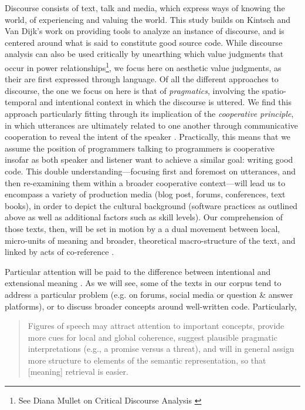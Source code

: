 Discourse consists of text, talk and media, which express ways of knowing the world, of experiencing and valuing the world. This study builds on Kintsch and Van Dijk's work on providing tools to analyze an instance of discourse, and is centered around what is said to constitute good source code. While discourse analysis can also be used critically by unearthing which value judgments that occur in power relationships\footnote{See Diana Mullet on Critical Discourse Analysis \citep{mullet_general_2018a}}, we focus here on aesthetic value judgments, as their are first expressed through language. Of all the different approaches to discourse, the one we focus on here is that of \emph{pragmatics}, involving the spatio-temporal and intentional context in which the discourse is uttered. We find this approach particularly fitting through its implication of the \emph{cooperative principle}, in which utterances are ultimately related to one another through communicative cooperation to reveal the intent of the speaker \citep{schiffrin_approaches_1994}. Practically, this means that we assume the position of programmers talking to programmers is cooperative insofar as both speaker and listener want to achieve a similar goal: writing good code. This double understanding—focusing first and foremost on utterances, and then re-examining them within a broader cooperative context—will lead us to encompass a variety of production media (blog post, forums, conferences, text books), in order to depict the cultural background (software practices as outlined above as well as additional factors such as skill levels). Our comprehension of those texts, then, will be set in motion by a a dual movement between local, micro-units of meaning and broader, theoretical macro-structure of the text, and linked by acts of co-reference \citep{kintsch_model_1978}.

Particular attention will be paid to the difference between intentional and extensional meaning \citep{dijk_strategies_1983}. As we will see, some of the texts in our corpus tend to address a particular problem (e.g. on forums, social media or question \& answer platforms), or to discuss broader concepts around well-written code. Particularly,

\begin{quote}
  Figures of speech may attract attention to important concepts, provide more cues for local and global coherence, suggest plausible pragmatic interpretations (e.g., a promise versus a threat), and will in general assign more structure to elements of the semantic representation, so that [meaning] retrieval is easier. \citep{dijk_strategies_1983}
\end{quote}

